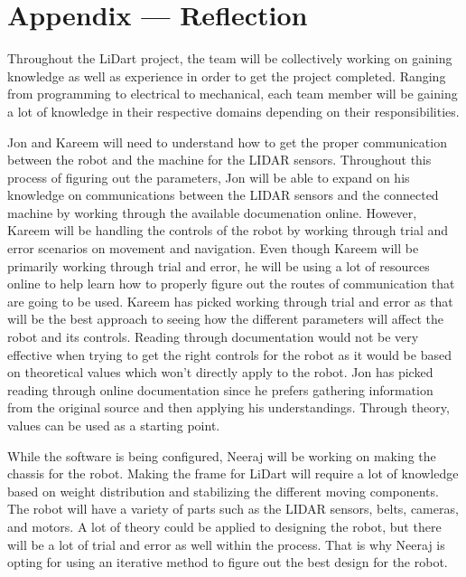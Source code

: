 \documentclass[12pt]{article}
\begin{document}
\newpage{}
\section*{Appendix --- Reflection}

	Throughout the LiDart project, the team will be collectively working on gaining knowledge as well as experience in order to get the project completed.  Ranging from programming to electrical to mechanical, each team member will be gaining a lot of knowledge in their respective domains depending on their responsibilities.

Jon and Kareem will need to understand how to get the proper communication between the robot and the machine for the LIDAR sensors.
Throughout this process of figuring out the parameters, Jon will be able to expand on his knowledge on communications between the LIDAR sensors and the connected machine by working through the available documenation online. However, Kareem will be handling the controls of the robot by working through trial and error scenarios on movement and navigation. Even though Kareem will be primarily working through trial and error, he will be using a lot of resources online to help learn how to properly figure out the routes of communication that are going to be used.
Kareem has picked working through trial and error as that will be the best approach to seeing how the different parameters will affect the robot and its controls. Reading through documentation would not be very effective when trying to get the right controls for the robot as it would be based on theoretical values which won't directly apply to the robot. Jon has picked reading through online documentation since he prefers gathering information from the original source and then applying his understandings. Through theory, values can be used as a starting point.

While the software is being configured, Neeraj will be working on making the chassis for the robot. Making the frame for LiDart will require a lot of knowledge based on weight distribution and stabilizing the different moving components. The robot will have a variety of parts such as the LIDAR sensors, belts, cameras, and motors.
A lot of theory could be applied to designing the robot, but there will be a lot of trial and error as well within the process. That is why Neeraj is opting for using an iterative method to figure out the best design for the robot. 
\end{document}
